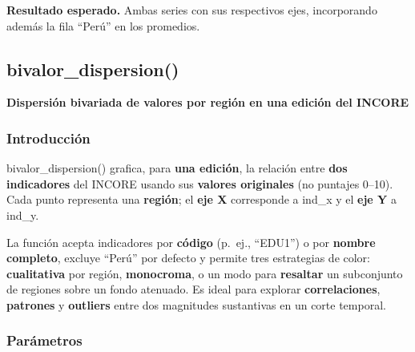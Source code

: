 \documentclass[
  11pt,
  letterpaper,
  DIV=11,
  numbers=noendperiod]{scrartcl}
\begin{document}
\textbf{Resultado esperado.} Ambas series con sus respectivos ejes,
incorporando además la fila ``Perú'' en los promedios.

\subsection{\texorpdfstring{\textbf{bivalor\_dispersion()}}{bivalor\_dispersion()}}\label{bivalor_dispersion}

\textbf{Dispersión bivariada de valores por región en una edición del
INCORE}

\subsubsection{\texorpdfstring{\textbf{Introducción}}{Introducción}}\label{introducciuxf3n-11}

bivalor\_dispersion() grafica, para \textbf{una edición}, la relación
entre \textbf{dos indicadores} del INCORE usando sus \textbf{valores
originales} (no puntajes 0--10). Cada punto representa una
\textbf{región}; el \textbf{eje X} corresponde a ind\_x y el \textbf{eje
Y} a ind\_y.

La función acepta indicadores por \textbf{código} (p.~ej., ``EDU1'') o
por \textbf{nombre completo}, excluye ``Perú'' por defecto y permite
tres estrategias de color: \textbf{cualitativa} por región,
\textbf{monocroma}, o un modo para \textbf{resaltar} un subconjunto de
regiones sobre un fondo atenuado. Es ideal para explorar
\textbf{correlaciones}, \textbf{patrones} y \textbf{outliers} entre dos
magnitudes sustantivas en un corte temporal.

\subsubsection{\texorpdfstring{\textbf{Parámetros}}{Parámetros}}\label{paruxe1metros-12}
\end{document}
